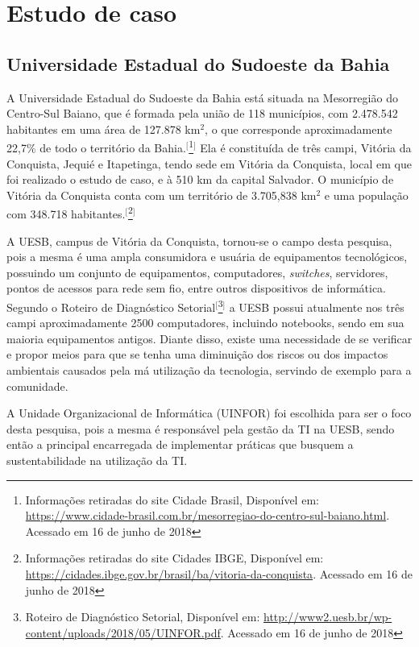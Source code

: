 
\chapter{Estudo de caso}\label{chap:estudodecaso}

\section{Universidade Estadual do Sudoeste da Bahia}

A Universidade Estadual do Sudoeste da Bahia está situada na Mesorregião do Centro-Sul Baiano, que é formada pela união de 118 municípios, com 2.478.542 habitantes em uma área de 127.878 km$^{2}$, o que corresponde aproximadamente 22,7\% de todo o território da Bahia.$^{[}$\footnote{Informações retiradas do site Cidade Brasil, Disponível em: \url{https://www.cidade-brasil.com.br/mesorregiao-do-centro-sul-baiano.html}. Acessado em 16 de junho de 2018}$^{]}$ Ela é constituída de três campi, Vitória da Conquista, Jequié e Itapetinga, tendo sede em Vitória da Conquista, local em que foi realizado o estudo de caso, e à 510 km da capital Salvador. O município de Vitória da Conquista conta com um território de 3.705,838 km$^{2}$ e uma população com 348.718 habitantes.$^{[}$\footnote{Informações retiradas do site Cidades IBGE, Disponível em: \url{https://cidades.ibge.gov.br/brasil/ba/vitoria-da-conquista}.  Acessado em 16 de junho de 2018}$^{]}$

A UESB, campus de Vitória da Conquista, tornou-se o campo desta pesquisa, pois a mesma é uma ampla consumidora e usuária de equipamentos tecnológicos, possuindo um conjunto de equipamentos, computadores, \textit{switches}, servidores, pontos de acessos para rede sem fio, entre outros dispositivos de informática. Segundo o Roteiro de Diagnóstico Setorial$^{[}$\footnote{Roteiro de Diagnóstico Setorial, Disponível em: \url{http://www2.uesb.br/wp-content/uploads/2018/05/UINFOR.pdf}.  Acessado em 16 de junho de 2018}$^{]}$ a UESB possui atualmente nos três campi aproximadamente 2500 computadores, incluindo notebooks, sendo em sua maioria equipamentos antigos. Diante disso, existe uma necessidade de se verificar e propor meios para que se tenha uma diminuição dos riscos ou dos impactos ambientais causados pela má utilização da tecnologia, servindo de exemplo para a comunidade.

A Unidade Organizacional de Informática (UINFOR) foi escolhida para ser o foco desta pesquisa, pois a mesma é responsável pela gestão da TI na UESB, sendo então a principal encarregada de implementar práticas que busquem a sustentabilidade na utilização da TI. 

